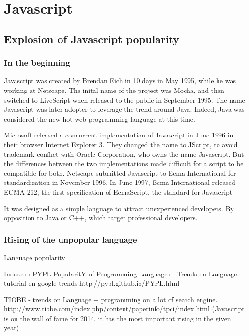 \section{Javascript}

\subsection{Explosion of Javascript popularity}

\subsubsection{In the beginning}

Javascript was created by Brendan Eich in 10 days in May 1995, while he was working at Netscape.
The inital name of the project was Mocha, and then switched to LiveScript when released to the public in September 1995.
The name Javascript was later adopter to leverage the trend around Java.
Indeed, Java was considered the new hot web programming language at this time.

Microsoft released a concurrent implementation of Javascript in June 1996 in their browser Internet Explorer 3.
They changed the name to JScript, to avoid trademark conflict with Oracle Corporation, who owns the name Javascript.
But the differences between the two implementations made difficult for a script to be compatible for both.
Netscape submitted Javascript to Ecma International for standardization in November 1996.
In June 1997, Ecma International released ECMA-262, the first specification of EcmaScript, the standard for Javascript.

It was designed as a simple language to attract unexperienced developers.
By opposition to Java or C++, which target professional developers.

\subsubsection{Rising of the unpopular language}

Language popularity

Indexes : 
PYPL PopularitY of Programming Languages - Trends on Language + tutorial on google trends
http://pypl.github.io/PYPL.html

TIOBE - trends on Language + programming on a lot of search engine.
http://www.tiobe.com/index.php/content/paperinfo/tpci/index.html
(Javascript is on the wall of fame for 2014, it has the most important rising in the given year)


